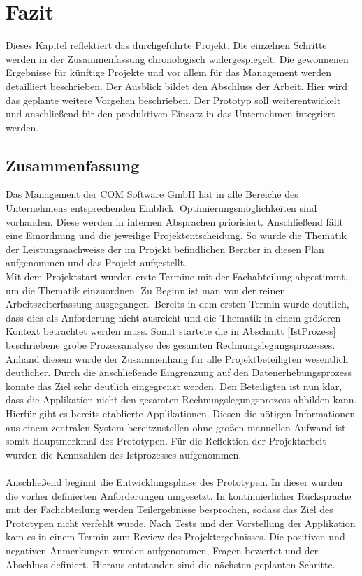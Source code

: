 \newpage
\section{Fazit}
Dieses Kapitel reflektiert das durchgeführte Projekt. Die einzelnen Schritte werden in der Zusammenfassung chronologisch widergespiegelt. Die gewonnenen Ergebnisse für künftige Projekte und vor allem für das Management werden detailliert beschrieben. Der Ausblick bildet den Abschluss der Arbeit. Hier wird das geplante weitere Vorgehen beschrieben. Der Prototyp soll weiterentwickelt und anschließend für den produktiven Einsatz in das Unternehmen integriert werden.
\subsection{Zusammenfassung}
Das Management der COM Software GmbH hat in alle Bereiche des Unternehmens entsprechenden Einblick. Optimierungsmöglichkeiten sind vorhanden. Diese werden in internen Absprachen priorisiert. Anschließend fällt eine Einordnung und die jeweilige Projektentscheidung. So wurde die Thematik der Leistungsnachweise der im Projekt befindlichen Berater in diesen Plan aufgenommen und das Projekt aufgestellt.\\
Mit dem Projektstart wurden erste Termine mit der Fachabteilung abgestimmt, um die Thematik einzuordnen. Zu Beginn ist man von der reinen Arbeitszeiterfassung ausgegangen. Bereits in dem ersten Termin wurde deutlich, dass dies als Anforderung nicht ausreicht und die Thematik in einem größeren Kontext betrachtet werden muss. Somit startete die in Abschnitt \ref{IstProzess} beschriebene grobe Prozessanalyse des gesamten Rechnungslegungsprozesses. Anhand diesem wurde der Zusammenhang für alle Projektbeteiligten wesentlich deutlicher. Durch die anschließende Eingrenzung auf den Datenerhebungsprozess konnte das Ziel sehr deutlich eingegrenzt werden. Den Beteiligten ist nun klar, dass die Applikation nicht den gesamten Rechnungslegungsprozess abbilden kann. Hierfür gibt es bereits etablierte Applikationen. Diesen die nötigen Informationen aus einem zentralen System bereitzustellen ohne großen manuellen Aufwand ist somit Hauptmerkmal des Prototypen. Für die Reflektion der Projektarbeit wurden die Kennzahlen des Istprozesses aufgenommen.\\\\
\noindent
Anschließend beginnt die Entwicklungsphase des Prototypen. In dieser wurden die vorher definierten Anforderungen umgesetzt. In kontinuierlicher Rücksprache mit der Fachabteilung werden Teilergebnisse besprochen, sodass das Ziel des Prototypen nicht verfehlt wurde. Nach Tests und der Vorstellung der Applikation kam es in einem Termin zum Review des Projektergebnisses. Die positiven und negativen Anmerkungen wurden aufgenommen, Fragen bewertet und der Abschluss definiert. Hieraus entstanden sind die nächsten geplanten Schritte.

